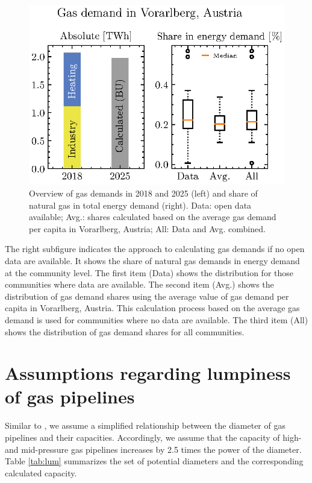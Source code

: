 \documentclass[review]{elsarticle}
\begin{document}
\begin{figure}[h]
	\centering
	\includegraphics[width=0.75\linewidth]{figures/Comparison_of_the_demand.eps}
	\caption{Overview of gas demands in 2018 and 2025 (left) and share of natural gas in total energy demand (right). Data: open data available; Avg.: shares calculated based on the average gas demand per capita in Vorarlberg, Austria; All: Data and Avg. combined.}
	\label{fig:comp}
\end{figure}

The right subfigure indicates the approach to calculating gas demands if no open data are available. It shows the share of natural gas demands in energy demand at the community level. The first item (Data) shows the distribution for those communities where data are available. The second item (Avg.) shows the distribution of gas demand shares using the average value of gas demand per capita in Vorarlberg, Austria. This calculation process based on the average gas demand is used for communities where no data are available. The third item (All) shows the distribution of gas demand shares for all communities.



\section{Assumptions regarding lumpiness of gas pipelines}\label{app:lum}
Similar to \cite{von2006reform}, we assume a simplified relationship between the diameter of gas pipelines and their capacities. Accordingly, we assume that the capacity of high- and mid-pressure gas pipelines increases by 2.5 times the power of the diameter. Table \ref{tab:lum} summarizes the set of potential diameters and the corresponding calculated capacity. 
\end{document}

